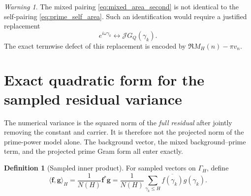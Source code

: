 \documentclass[11pt]{amsart}
\numberwithin{equation}{section}
\theoremstyle{plain}
\theoremstyle{definition}
\newtheorem{definition}[theorem]{Definition}
\theoremstyle{remark}
\newtheorem{warning}[theorem]{Warning}
\newcommand{\1}{\mathbf{1}}
\newcommand{\cJ}{\mathcal J}
\begin{document}
\begin{warning}
\label{warn:mixed_not_self}
The mixed pairing \eqref{eq:mixed_area_second} is not identical to the
self-pairing \eqref{eq:prime_self_area}.  Such an identification would
require a justified replacement
\begin{equation}
e^{i\omega\gamma_k}
\longleftrightarrow
\cJ G_Q(\gamma_k).
\label{eq:unproved_operator_replacement}
\end{equation}
The exact termwise defect of this replacement is encoded by
\(\Re M_H(n)-\pi v_n\).
\end{warning}

\section{Exact quadratic form for the sampled residual variance}
\label{sec:exact_variance_form}

The numerical variance is the squared norm of the \emph{full residual}
after jointly removing the constant and carrier.  It is therefore not the
projected norm of the prime-power model alone.  The background vector, the
mixed background--prime term, and the projected prime Gram form all enter
exactly.

\begin{definition}[Sampled inner product]
\label{def:sample_inner_product}
For sampled vectors on $\Gamma_H$, define
\begin{equation}
\langle \mathbf f,\mathbf g\rangle_H
=
\frac1{N(H)}\mathbf f^\ast\mathbf g
=
\frac1{N(H)}\sum_{\gamma_k\leq H}
\overline{f(\gamma_k)}g(\gamma_k).
\label{eq:sample_inner_product}
\end{equation}
\end{definition}
\end{document}
